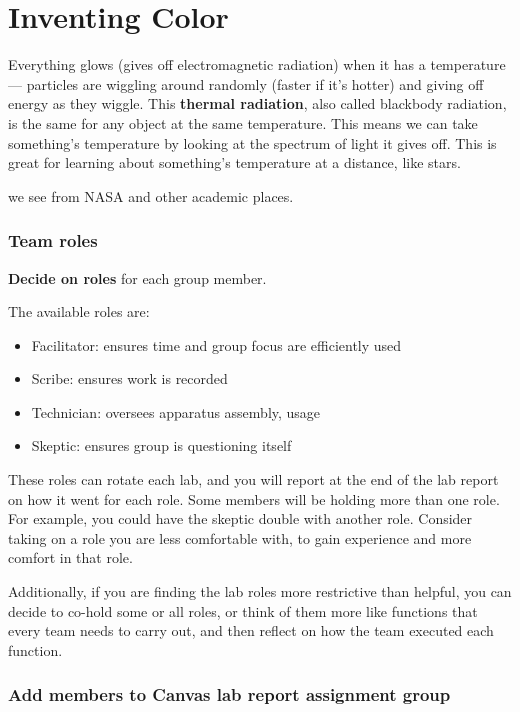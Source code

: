 \chapter{Inventing Color}
Everything glows (gives off electromagnetic radiation) when it has a temperature --- particles are wiggling around randomly (faster if it's hotter) and giving off energy as they wiggle. This \textbf{thermal radiation}, also called blackbody radiation, is the same for any object at the same temperature. This means we can take something's temperature by looking at the spectrum of light it gives off. This is great for learning about something's temperature at a distance, like stars.

we see from NASA and other academic places.

\subsection{Team roles}

\begin{steps}
	\item \textbf{Decide on roles} for each group member.
\end{steps}

The available roles are:
\begin{itemize}
	\item Facilitator: ensures time and group focus are efficiently used
	\item Scribe: ensures work is recorded
	\item Technician: oversees apparatus assembly, usage
	\item Skeptic: ensures group is questioning itself
\end{itemize}

These roles can rotate each lab, and you will report at the end of the lab report on how it went for each role. Some members will be holding more than one role. For example, you could have the skeptic double with another role. Consider taking on a role you are less comfortable with, to gain experience and more comfort in that role.

Additionally, if you are finding the lab roles more restrictive than helpful, you can decide to co-hold some or all roles, or think of them more like functions that every team needs to carry out, and then reflect on how the team executed each function.

\subsection{Add members to Canvas lab report assignment group}

